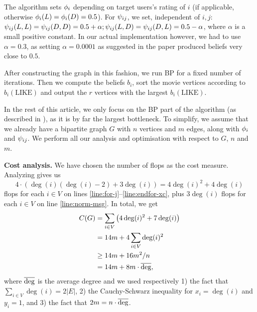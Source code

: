 \documentclass[letterpaper]{article}
\let\cref=\Cref %
\newcommand{\mypar}[1]{{\bf #1.}}
\begin{document}
The algorithm sets $\phi_i$ depending on target users's rating of $i$ (if applicable, otherwise $\phi_i(L) = \phi_i(D) = 0.5$). For $\psi_{ij}$, we set, independent of $i, j$:
$\psi_{ij}(L, L) = \psi_{ij}(D, D) = 0.5 + \alpha; \psi_{ij}(L,
D) = \psi_{ij}(D, L) = 0.5 - \alpha$, where
$\alpha$ is a small positive constant. In our actual implementation however, we had to use $\alpha = 0.3$, as setting $\alpha = 0.0001$ as suggested in the paper produced beliefs very close to $0.5$.

After constructing the graph in this fashion, we run BP for a fixed number of
iterations. Then we compute the beliefs $b_i$, sort the movie
vertices according to $b_i(\text{LIKE})$ and output the $r$ vertices with the
largest $b_i(\text{LIKE})$.

In the rest of this article, we only focus on the BP part of the algorithm (as
described in \cref{algo:propagate}), as it is by far the largest bottleneck. To
simplify, we assume that we already have a bipartite graph $G$ with $n$
vertices and $m$ edges, along with $\phi_i$ and $\psi_{ij}$. We perform
all our analysis and optimisation with respect to $G$, $n$ and $m$.

\mypar{Cost analysis} We have chosen the number of flops as the cost measure.
Analyzing \cref{algo:propagate} gives us $$4 \cdot (\deg(i) (\deg(i) - 2) +
3\deg(i)) = 4\deg(i)^2 + 4\deg(i)$$ flops for each $i\in V$ on lines
\ref{line:for-j}--\ref{line:endfor-xc}, plus $3\deg(i)$ flops for each $i \in V$ on line \ref{line:norm-msg}. In total, we get
%
\begin{align*}
	C(G)
	&= \sum_{i \in V}\left(4\deg(i)^2 + 7\deg(i)\right) \\
	&= 14m + 4\sum_{i\in V} \deg(i)^2\\
	&\ge 14m + 16m^2 / n \\
	&= 14m + 8m \cdot \overline{\deg},
\end{align*}
%
where $\overline{\deg}$ is the average degree and we used respectively 1) the fact that $\sum_{i\in V}\deg(i) = 2|E|$, 2) the Cauchy-Schwarz inequality for $x_i = \deg(i)$ and $y_i = 1$, and 3) the fact that $2m = n\cdot\overline{\deg}$.
\end{document}
